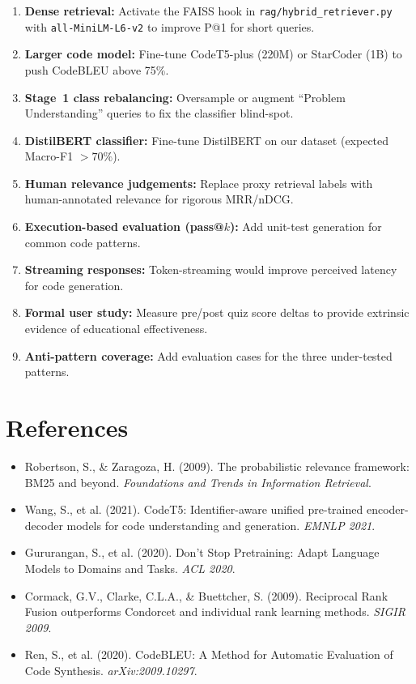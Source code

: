 \documentclass[12pt,a4paper]{article}
\begin{document}
\begin{enumerate}[leftmargin=*]
  \item \textbf{Dense retrieval:} Activate the FAISS hook in \texttt{rag/hybrid\_retriever.py} with \texttt{all-MiniLM-L6-v2} to improve P@1 for short queries.
  \item \textbf{Larger code model:} Fine-tune CodeT5-plus (220M) or StarCoder (1B) to push CodeBLEU above 75\%.
  \item \textbf{Stage~1 class rebalancing:} Oversample or augment ``Problem Understanding'' queries to fix the classifier blind-spot.
  \item \textbf{DistilBERT classifier:} Fine-tune DistilBERT on our dataset (expected Macro-F1 $>70\%$).
  \item \textbf{Human relevance judgements:} Replace proxy retrieval labels with human-annotated relevance for rigorous MRR/nDCG.
  \item \textbf{Execution-based evaluation (pass@$k$):} Add unit-test generation for common code patterns.
  \item \textbf{Streaming responses:} Token-streaming would improve perceived latency for code generation.
  \item \textbf{Formal user study:} Measure pre/post quiz score deltas to provide extrinsic evidence of educational effectiveness.
  \item \textbf{Anti-pattern coverage:} Add evaluation cases for the three under-tested patterns.
\end{enumerate}

\section{References}

\begin{itemize}[leftmargin=*]
  \item Robertson, S., \& Zaragoza, H. (2009). The probabilistic relevance framework: BM25 and beyond. \textit{Foundations and Trends in Information Retrieval}.
  \item Wang, S., et al. (2021). CodeT5: Identifier-aware unified pre-trained encoder-decoder models for code understanding and generation. \textit{EMNLP 2021}.
  \item Gururangan, S., et al. (2020). Don't Stop Pretraining: Adapt Language Models to Domains and Tasks. \textit{ACL 2020}.
  \item Cormack, G.V., Clarke, C.L.A., \& Buettcher, S. (2009). Reciprocal Rank Fusion outperforms Condorcet and individual rank learning methods. \textit{SIGIR 2009}.
  \item Ren, S., et al. (2020). CodeBLEU: A Method for Automatic Evaluation of Code Synthesis. \textit{arXiv:2009.10297}.
\end{itemize}
\end{document}
